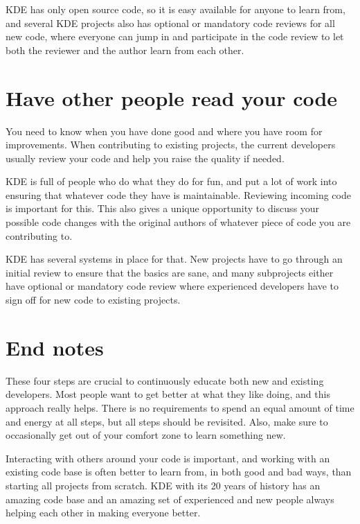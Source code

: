 KDE has only open source code, so it is easy available for anyone to learn from, and several KDE projects also has optional or mandatory code reviews for all new code, where everyone can jump in and participate in the code review to let both the reviewer and the author learn from each other.

\section*{Have other people read your code}
You need to know when you have done good and where you have room for improvements. When contributing to existing projects, the current developers usually review your code and help you raise the quality if needed.

KDE is full of people who do what they do for fun, and put a lot of work into ensuring that whatever code they have is maintainable. Reviewing incoming code is important for this. This also gives a unique opportunity to discuss your possible code changes with the original authors of whatever piece of code you are contributing to.

KDE has several systems in place for that. New projects have to go through an initial review to ensure that the basics are sane, and many subprojects either have optional or mandatory code review where experienced developers have to sign off for new code to existing projects.

\section*{End notes}
These four steps are crucial to continuously educate both new and existing developers. Most people want to get better at what they like doing, and this approach really helps. There is no requirements to spend an equal amount of time and energy at all steps, but all steps should be revisited. Also, make sure to occasionally get out of your comfort zone to learn something new.

Interacting with others around your code is important, and working with an existing code base is often better to learn from, in both good and bad ways, than starting all projects from scratch. KDE with its 20 years of history has an amazing code base and an amazing set of experienced and new people always helping each other in making everyone better.


